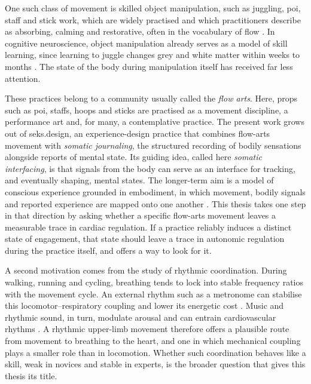 One such class of movement is skilled object manipulation, such as juggling, poi, staff and stick work, which are widely practised and which practitioners describe as absorbing, calming and restorative, often in the vocabulary of flow \citep{csikszentmihalyi1990}. In cognitive neuroscience, object manipulation already serves as a model of skill learning, since learning to juggle changes grey and white matter within weeks to months \citep{draganski2004,scholz2009}. The state of the body during manipulation itself has received far less attention.


These practices belong to a community usually called the \emph{flow arts}. Here, props such as poi, staffs, hoops and sticks are practised as a movement discipline, a performance art and, for many, a contemplative practice. The present work grows out of seks.design, an experience-design practice that combines flow-arts movement with \emph{somatic journaling}, the structured recording of bodily sensations alongside reports of mental state. Its guiding idea, called here \emph{somatic interfacing}, is that signals from the body can serve as an interface for tracking, and eventually shaping, mental states. The longer-term aim is a model of conscious experience grounded in embodiment, in which movement, bodily signals and reported experience are mapped onto one another . This thesis takes one step in that direction by asking whether a specific flow-arts movement leaves a measurable trace in cardiac regulation. If a practice reliably induces a distinct state of engagement, that state should leave a trace in autonomic regulation during the practice itself, and \al{} offers a way to look for it.


A second motivation comes from the study of rhythmic coordination. During walking, running and cycling, breathing tends to lock into stable frequency ratios with the movement cycle. An external rhythm such as a metronome can stabilise this locomotor--respiratory coupling and lower its energetic cost \citep{hoffmann2012,bardy2015}. Music and rhythmic sound, in turn, modulate arousal and can entrain cardiovascular rhythms \citep{bernardi2009,trappe2010}. A rhythmic upper-limb movement therefore offers a plausible route from movement to breathing to the heart, and one in which mechanical coupling plays a smaller role than in locomotion. Whether such coordination behaves like a skill, weak in novices and stable in experts, is the broader question that gives this thesis its title.

